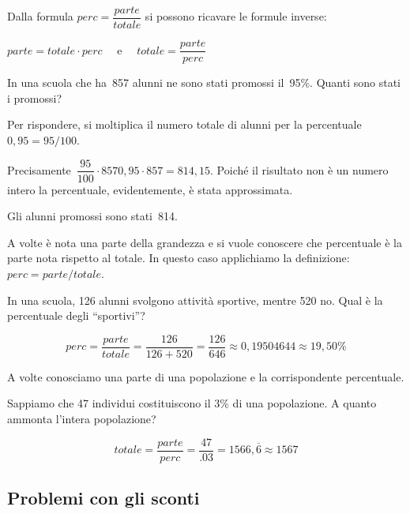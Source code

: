 Dalla formula \quad \(perc = \dfrac{parte}{totale}\) \quad 
si possono ricavare le formule inverse: 

\hspace*{25mm}
\(parte = totale \cdot perc \quad \text{ e } \quad 
  totale = \dfrac{parte}{perc}\)


\begin{esempio}{}{}
In una scuola che ha~857 alunni ne sono stati promossi il~95\%. 
Quanti sono stati i promossi?

Per rispondere, si moltiplica il numero totale di alunni per la 
percentuale~\(0,95 = 95/100\).

Precisamente~\(\dfrac{95}{100} \cdot 857 0,95 \cdot 857 = 814,15\).
Poiché il risultato non è un numero intero la percentuale, evidentemente, 
è stata approssimata. 

Gli alunni promossi sono stati~814.
 \end{esempio}

A volte è nota una parte della grandezza e si vuole conoscere che 
percentuale è la parte nota rispetto al totale. 
In questo caso applichiamo la definizione: \(perc = parte/totale\).

\begin{esempio}{}{}
In una scuola, 126 alunni svolgono attività sportive, mentre 520 no.
Qual è la percentuale degli ``sportivi''?

\vspace{-.5em}
\[perc = \frac{parte}{totale} =
\frac{126}{126+520} = \frac{126}{646} \approx 0,19504644 \approx 19,50\%\]
\end{esempio}

A volte conosciamo una parte di una popolazione e la corrispondente 
percentuale.

\begin{esempio}{}{}
Sappiamo che 47 individui costituiscono il 3\% di una popolazione. 
A quanto ammonta l'intera popolazione?

\vspace{-.5em}
\[totale = \frac{parte}{perc} = \frac{47}{.03} = 1566,\overline 6 
\approx 1567\]
\end{esempio}

\subsection{Problemi con gli sconti}

